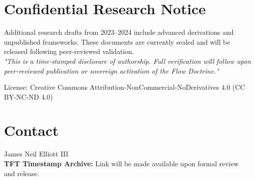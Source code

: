 \documentclass[11pt]{article}
\begin{document}
\section*{Confidential Research Notice}
Additional research drafts from 2023--2024 include advanced derivations and unpublished frameworks. These documents are currently sealed and will be released following peer-reviewed validation.\\
\textit{"This is a time-stamped disclosure of authorship. Full verification will follow upon peer-reviewed publication or sovereign activation of the Flow Doctrine."}

\vspace{2em}
{\footnotesize \noindent License: Creative Commons Attribution-NonCommercial-NoDerivatives 4.0 (CC BY-NC-ND 4.0)}

\section*{Contact}
James Neil Elliott III\\
\textbf{TFT Timestamp Archive:} Link will be made available upon formal review and release.
\end{document}
